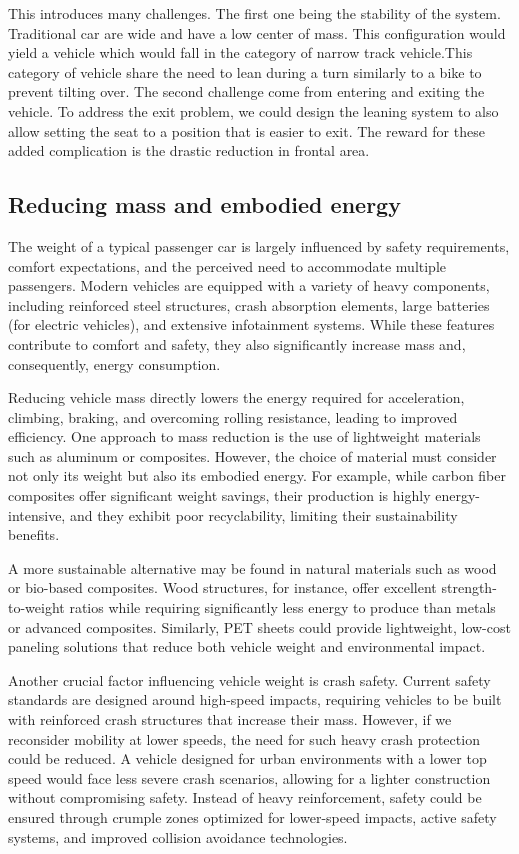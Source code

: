 This introduces many challenges.
The first one being the stability of the system. Traditional car are wide and have a low center of mass. This configuration would yield a vehicle which would fall in the category of narrow track vehicle.This category of vehicle share the need to lean during a turn similarly to a bike to prevent tilting over. The second challenge come from entering and exiting the vehicle. To address the exit problem, we could design the leaning system to also allow setting the seat to a position that is easier to exit. The reward for these added complication is the drastic reduction in frontal area.

\subsection{Reducing mass and embodied energy}

The weight of a typical passenger car is largely influenced by safety requirements, comfort expectations, and the perceived need to accommodate multiple passengers. Modern vehicles are equipped with a variety of heavy components, including reinforced steel structures, crash absorption elements, large batteries (for electric vehicles), and extensive infotainment systems. While these features contribute to comfort and safety, they also significantly increase mass and, consequently, energy consumption.

Reducing vehicle mass directly lowers the energy required for acceleration, climbing, braking, and overcoming rolling resistance, leading to improved efficiency. One approach to mass reduction is the use of lightweight materials such as aluminum or composites. However, the choice of material must consider not only its weight but also its embodied energy. For example, while carbon fiber composites offer significant weight savings, their production is highly energy-intensive, and they exhibit poor recyclability, limiting their sustainability benefits.

A more sustainable alternative may be found in natural materials such as wood or bio-based composites. Wood structures, for instance, offer excellent strength-to-weight ratios while requiring significantly less energy to produce than metals or advanced composites. Similarly, PET sheets could provide lightweight, low-cost paneling solutions that reduce both vehicle weight and environmental impact.

Another crucial factor influencing vehicle weight is crash safety. Current safety standards are designed around high-speed impacts, requiring vehicles to be built with reinforced crash structures that increase their mass. However, if we reconsider mobility at lower speeds, the need for such heavy crash protection could be reduced. A vehicle designed for urban environments with a lower top speed would face less severe crash scenarios, allowing for a lighter construction without compromising safety. Instead of heavy reinforcement, safety could be ensured through crumple zones optimized for lower-speed impacts, active safety systems, and improved collision avoidance technologies.

